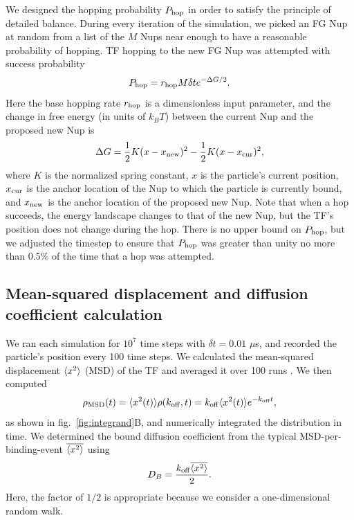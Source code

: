 We designed the hopping probability $P_{\rm hop}$ in order to satisfy the principle of detailed balance.  During every iteration of the simulation, we picked an FG Nup at random from a list of the $M$  Nups near enough to have a reasonable probability of hopping. TF hopping to the new FG Nup was attempted with success probability
\begin{equation}
P_{\rm hop} = r_{\mathrm{hop}} M \delta t e^{-\Delta G /2}.
\end{equation}
Here the base hopping rate $r_{\mathrm{hop}}$ is a dimensionless input parameter, and the change in free energy (in units of $k_BT$) between the current Nup and the proposed new Nup is
\begin{equation}
  \Delta G = \frac{1}{2} K (x-x_{\mathrm{new}})^2 - \frac{1}{2} K (x -
  x_{\mathrm{cur}})^2,
\end{equation}
where $K$ is the normalized spring constant, $x$ is the particle's current position, $x_{\mathrm{cur}}$ is the anchor location of the Nup to which the particle is currently bound, and $x_{\mathrm{new}}$ is the anchor location of the proposed new Nup. Note that when a hop succeeds, the energy landscape changes to that of the new Nup, but the TF's position does not change during the hop.  There is no upper bound on $P_{\rm hop}$, but we adjusted the timestep to ensure that $P_{\rm hop}$ was greater than
unity no more than 0.5\% of the time that a hop was attempted.

\subsection{Mean-squared displacement and diffusion coefficient calculation}
We ran each simulation for $10^7$ time steps with $\delta t = 0.01$ $\mu$s, and recorded the particle's position every 100 time steps.  We calculated the mean-squared displacement $\langle x^2 \rangle$ (MSD) of the TF and averaged it over 100 runs .  We then computed
\begin{equation}
\rho_{\mathrm{MSD}} (t)= \langle x^2(t) \rangle \rho(k_{\rm off},t) = k_{\rm off} \langle x^2(t) \rangle
e^{-k_{\rm off} t}, 
\end{equation}
as shown in fig.~\ref{fig:integrand}B, and numerically integrated the distribution in time. We determined the bound diffusion coefficient from the typical MSD-per-binding-event $\overline{\langle x^2 \rangle}$ using
\begin{equation}
D_B = \frac{k_{\rm off} \overline{\langle x^2 \rangle}}{2}. 
\end{equation}   
Here, the factor of $1/2$ is appropriate because we consider a one-dimensional random walk.

